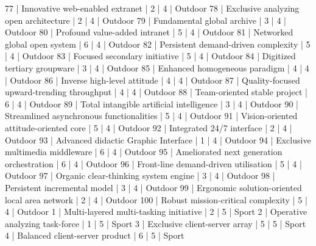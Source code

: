 \begin{enumerate}
\begin{pseudo*}
      77 | Innovative web-enabled extranet                  |        2 |      4 | Outdoor       
      78 | Exclusive analyzing open architecture            |        2 |      4 | Outdoor       
      79 | Fundamental global archive                       |        3 |      4 | Outdoor       
      80 | Profound value-added intranet                    |        5 |      4 | Outdoor       
      81 | Networked global open system                     |        6 |      4 | Outdoor       
      82 | Persistent demand-driven complexity              |        5 |      4 | Outdoor       
      83 | Focused secondary initiative                     |        5 |      4 | Outdoor       
      84 | Digitized tertiary groupware                     |        3 |      4 | Outdoor       
      85 | Enhanced homogeneous paradigm                    |        4 |      4 | Outdoor       
      86 | Inverse high-level attitude                      |        4 |      4 | Outdoor       
      87 | Quality-focused upward-trending throughput       |        4 |      4 | Outdoor       
      88 | Team-oriented stable project                     |        6 |      4 | Outdoor       
      89 | Total intangible artificial intelligence         |        3 |      4 | Outdoor       
      90 | Streamlined asynchronous functionalities         |        5 |      4 | Outdoor       
      91 | Vision-oriented attitude-oriented core           |        5 |      4 | Outdoor       
      92 | Integrated 24/7 interface                        |        2 |      4 | Outdoor       
      93 | Advanced didactic Graphic Interface              |        1 |      4 | Outdoor       
      94 | Exclusive multimedia middleware                  |        6 |      4 | Outdoor       
      95 | Ameliorated next generation orchestration        |        6 |      4 | Outdoor       
      96 | Front-line demand-driven utilisation             |        5 |      4 | Outdoor       
      97 | Organic clear-thinking system engine             |        3 |      4 | Outdoor       
      98 | Persistent incremental model                     |        3 |      4 | Outdoor       
      99 | Ergonomic solution-oriented local area network   |        2 |      4 | Outdoor       
     100 | Robust mission-critical complexity               |        5 |      4 | Outdoor       
       1 | Multi-layered multi-tasking initiative           |        2 |      5 | Sport
       2 | Operative analyzing task-force                   |        1 |      5 | Sport
       3 | Exclusive client-server array                    |        5 |      5 | Sport
       4 | Balanced client-server product                   |        6 |      5 | Sport

\end{pseudo*}
\end{enumerate}
